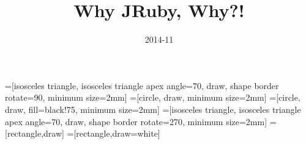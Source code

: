 \usepackage{etex}
\usepackage[english]{babel}

\usepackage[all]{xy}
\usepackage[latin1]{inputenc}

\usepackage{palatino,courier}
\usepackage{amsfonts,amssymb}
\usepackage[mathscr]{euscript}
\usepackage{stmaryrd}
\usepackage{eulervm}

\usepackage{proof}
\usepackage{amsmath}
\usepackage{xspace}

\usepackage{graphicx}
\usepackage{tikz}
\usepackage{listings}
\lstset{language=Ruby}
\usetikzlibrary{calc,arrows,positioning,shapes.geometric,fit,decorations.markings}


\tikzset{ node distance=.1mm, inner sep=0.5mm}

=[isosceles triangle, isosceles triangle apex angle=70, draw, shape border rotate=90, minimum size=2mm]
=[circle, draw, minimum size=2mm]
=[circle, draw, fill=black!75, minimum size=2mm]
=[isosceles triangle, isosceles triangle apex angle=70, draw, shape border rotate=270, minimum size=2mm]
=[rectangle,draw]
=[rectangle,draw=white]




\title{Why JRuby, Why?!}

\author[Brett~Giles]{}



\date
{2014-11}

\subject{JRuby}



